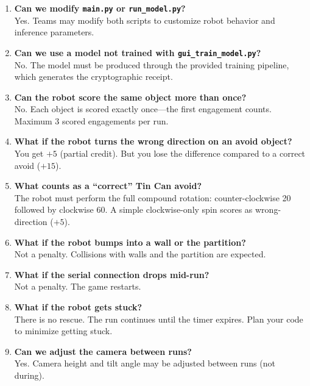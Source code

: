 \documentclass[a4]{article}
\begin{document}
\begin{enumerate}[label=\textbf{Q\arabic*:}, leftmargin=2.5em]
    \item \textbf{Can we modify \texttt{main.py} or \texttt{run\_model.py}?} \\
    Yes. Teams may modify both scripts to customize robot behavior and inference parameters.

    \item \textbf{Can we use a model not trained with \texttt{gui\_train\_model.py}?} \\
    No. The model must be produced through the provided training pipeline, which generates the cryptographic receipt.

    \item \textbf{Can the robot score the same object more than once?} \\
    No. Each object is scored exactly once---the first engagement counts. Maximum 3 scored engagements per run.

    \item \textbf{What if the robot turns the wrong direction on an avoid object?} \\
    You get $+5$ (partial credit). But you lose the difference compared to a correct avoid ($+15$).

    \item \textbf{What counts as a ``correct'' Tin Can avoid?} \\
    The robot must perform the full compound rotation: counter-clockwise 20\textdegree{} followed by clockwise 60\textdegree. A simple clockwise-only spin scores as wrong-direction ($+5$).

    \item \textbf{What if the robot bumps into a wall or the partition?} \\
    Not a penalty. Collisions with walls and the partition are expected.

    \item \textbf{What if the serial connection drops mid-run?} \\
    Not a penalty. The game restarts.

    \item \textbf{What if the robot gets stuck?} \\
    There is no rescue. The run continues until the timer expires. Plan your code to minimize getting stuck.

    \item \textbf{Can we adjust the camera between runs?} \\
    Yes. Camera height and tilt angle may be adjusted between runs (not during).


\end{enumerate}
\end{document}
